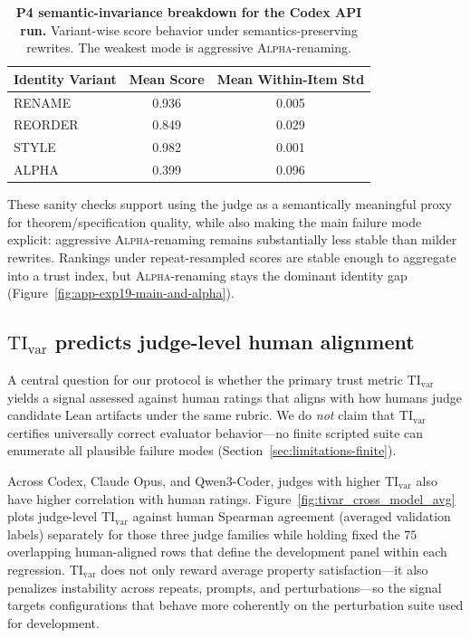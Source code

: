 \documentclass{article}
\begin{document}
\begin{table}[t]
  \centering
  \small
  \begin{tabular}{lcc}
    \toprule
    \textbf{Identity Variant} & \textbf{Mean Score} & \textbf{Mean Within-Item Std} \\
    \midrule
    RENAME                    & 0.936               & 0.005                         \\
    REORDER                   & 0.849               & 0.029                         \\
    STYLE                     & 0.982               & 0.001                         \\
    ALPHA                     & 0.399               & 0.096                         \\
    \bottomrule
  \end{tabular}
  \caption{\textbf{P4 semantic-invariance breakdown for the Codex API run.}
    Variant-wise score behavior under semantics-preserving rewrites. The weakest mode is aggressive \textsc{Alpha}-renaming.}
  \label{tab:codex_invariance_variants}
\end{table}

These sanity checks support using the judge as a semantically meaningful proxy for theorem/specification quality, while also making the main failure mode explicit: aggressive \textsc{Alpha}-renaming remains substantially less stable than milder rewrites. Rankings under repeat-resampled scores are stable enough to aggregate into a trust index, but \textsc{Alpha}-renaming stays the dominant identity gap (Figure~\ref{fig:app-exp19-main-and-alpha}).

\subsection{\texorpdfstring{\(\mathrm{TI}_{\mathrm{var}}\)}{TI-var} predicts judge-level human alignment}
\label{sec:tivar_cross_model_results}
\label{sec:validation-human-alignment}

A central question for our protocol is whether the primary trust metric \(\mathrm{TI}_{\mathrm{var}}\) yields a signal assessed against human ratings that aligns with how humans judge candidate Lean artifacts under the same rubric. We do \emph{not} claim that \(\mathrm{TI}_{\mathrm{var}}\) certifies universally correct evaluator behavior---no finite scripted suite can enumerate all plausible failure modes (Section~\ref{sec:limitations-finite}).

Across Codex, Claude Opus, and Qwen3-Coder, judges with higher \(\mathrm{TI}_{\mathrm{var}}\) also have higher correlation with human ratings. Figure~\ref{fig:tivar_cross_model_avg} plots judge-level \(\mathrm{TI}_{\mathrm{var}}\) against human Spearman agreement (averaged validation labels) separately for those three judge families while holding fixed the \(75\) overlapping human-aligned rows that define the development panel within each regression. \(\mathrm{TI}_{\mathrm{var}}\) does not only reward average property satisfaction---it also penalizes instability across repeats, prompts, and perturbations---so the signal targets configurations that behave more coherently on the perturbation suite used for development.
\end{document}
